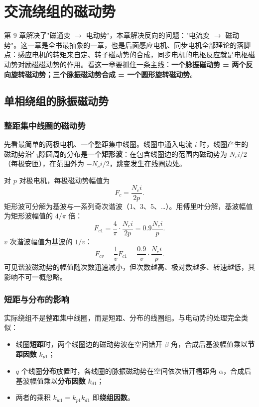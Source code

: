 \chapter{交流绕组的磁动势}

第 9 章解决了"磁通变 $\rightarrow$ 电动势"，本章解决反向的问题："电流变 $\rightarrow$ 磁动势"。这一章是全书最抽象的一章，也是后面感应电机、同步电机全部理论的落脚点：感应电机的转矩来自定、转子磁动势的合成，同步电机的电枢反应就是电枢磁动势对励磁磁动势的作用。看这一章要抓住一条主线：\textbf{一个脉振磁动势 = 两个反向旋转磁动势；三个脉振磁动势合成 = 一个圆形旋转磁动势}。

\section{单相绕组的脉振磁动势}

\subsection{整距集中线圈的磁动势}
先看最简单的两极电机、一个整距集中线圈。线圈中通入电流 $i$ 时，线圈产生的磁动势沿气隙圆周的分布是一个\textbf{矩形波}：在包含线圈边的范围内磁动势为 $N_ci/2$（每极安匝），在范围外为 $-N_ci/2$，跳变发生在线圈边处。

对 $p$ 对极电机，每极磁动势幅值为
\begin{equation}
F_c=\frac{N_ci}{2p}.
\end{equation}
矩形波可分解为基波与一系列奇次谐波（1、3、5、…）。用傅里叶分解，基波幅值为矩形波幅值的 $4/\pi$ 倍：
\begin{equation}
F_{c1}=\frac{4}{\pi}\cdot\frac{N_ci}{2p}=0.9\frac{N_ci}{p}.
\end{equation}
$v$ 次谐波幅值为基波的 $1/v$：
\begin{equation}
F_{cv}=\frac{1}{v}F_{c1}=\frac{0.9}{v}\cdot\frac{N_ci}{p}.
\end{equation}
可见谐波磁动势的幅值随次数迅速减小，但次数越高、极对数越多、转速越低，其影响不可一概忽略。

\subsection{短距与分布的影响}
实际绕组不是整距集中线圈，而是短距、分布的线圈组。与电动势的处理完全类似：
\begin{itemize}
  \item 线圈\textbf{短距}时，两个线圈边的磁动势波在空间错开 $\beta$ 角，合成后基波幅值乘以\textbf{节距因数} $k_{p1}$；
  \item $q$ 个线圈\textbf{分布}放置时，各线圈的脉振磁动势在空间依次错开槽距角 $\alpha$，合成后基波幅值乘以\textbf{分布因数} $k_{d1}$；
  \item 两者的乘积 $k_{w1}=k_{p1}k_{d1}$ 即\textbf{绕组因数}。
\end{itemize}

